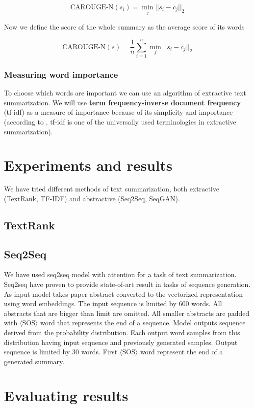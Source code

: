 \documentclass[sigplan]{acmart}
\begin{document}
\[ \text{CAROUGE-N}(s_i) = \operatorname*{min}_j ||s_i - c_j||_2 \]

Now we define the score of the whole summary as the average score of its words

\[ \text{CAROUGE-N}(s) = \frac1n \sum_{i=1}^n \operatorname*{min}_j ||s_i - c_j||_2 \]

\subsubsection{Measuring word importance}
\label{sec:importance}

To choose which words are important we can use an algorithm of extractive text summarization. We will use \textbf{term frequency-inverse document frequency} (tf-idf) as a measure of importance because of its simplicity and importance (according to \cite{kumar-16}, tf-idf is one of the universally used terminologies in extractive summarization).

\section{Experiments and results}

We have tried different methods of text summarization, both extractive (TextRank, TF-IDF) and abstractive (Seq2Seq, SeqGAN).

\subsection{TextRank}
\subsection{Seq2Seq}
We have used seq2seq model with attention for a task of text summarization. Seq2seq have proven to provide state-of-art result in tasks of sequence generation.
As input model takes paper abstract converted to the vectorized representation using word embeddings.  The input sequence is limited by 600 words. All abstracts that are bigger than limit are omitted. All smaller abstracts are padded with $\langle\text{SOS}\rangle$ word that represents the end of a sequence.
Model outputs sequence derived from the probability distribution. Each output word samples from this distribution having input sequence and previously generated samples. Output sequence is limited by 30 words. First $\langle\text{SOS}\rangle$ word represent the end of a generated summary.


\section{Evaluating results}
\end{document}
